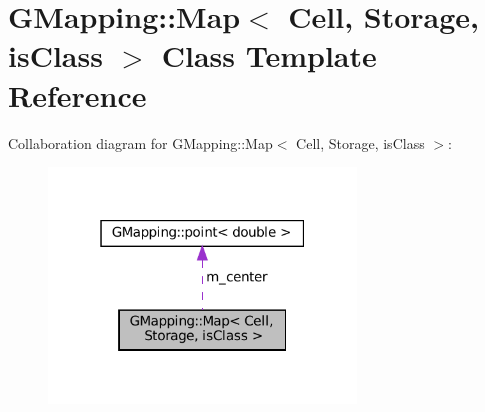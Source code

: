\hypertarget{classGMapping_1_1Map}{}\section{G\+Mapping\+:\+:Map$<$ Cell, Storage, is\+Class $>$ Class Template Reference}
\label{classGMapping_1_1Map}


Collaboration diagram for G\+Mapping\+:\+:Map$<$ Cell, Storage, is\+Class $>$\+:
\nopagebreak
\begin{figure}[H]
\begin{center}
\leavevmode
\includegraphics[width=232pt]{classGMapping_1_1Map__coll__graph}
\end{center}
\end{figure}
